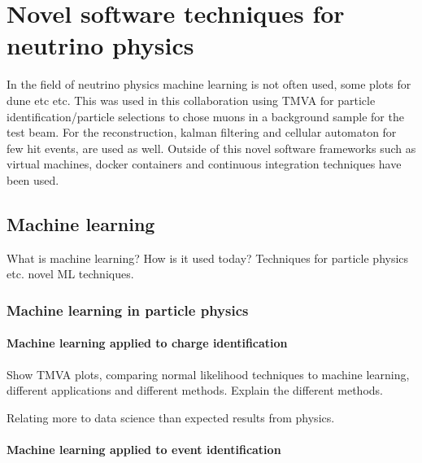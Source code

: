 \chapter{Novel software techniques for neutrino physics}
\label{c:test}

In the field of neutrino physics machine learning  is not often used, some plots for dune etc etc. This was used in this collaboration using TMVA for particle identification/particle selections to chose muons in a background sample for the test beam.
For the reconstruction, kalman filtering and cellular automaton for few hit events, are used as well.
Outside of this novel software frameworks such as virtual machines, docker containers and continuous integration techniques have been used.

\section{Machine learning}

What is machine learning? How is it used today? Techniques for particle physics etc. novel ML techniques.

\subsection{Machine learning in particle physics}

\subsubsection{Machine learning applied to charge identification}

Show TMVA plots, comparing normal likelihood techniques to machine learning, different applications and different methods. Explain the different methods.

Relating more to data science than expected results from physics.

\subsubsection{Machine learning applied to event identification}

